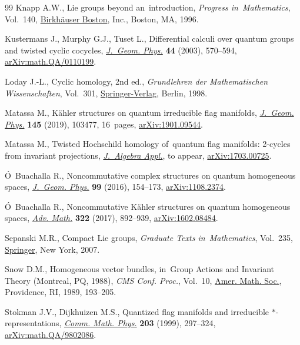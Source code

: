 \documentclass[pdftex]{sigma}
\numberwithin{equation}{section}
\begin{document}
\begin{thebibliography}{99}
Knapp A.W., Lie groups beyond an~introduction, \textit{Progress in~Mathematics}, Vol.~140, \href{https://doi.org/10.1007/978-1-4757-2453-0}{Birkh\"auser Boston}, Inc., Boston, MA, 1996.

Kustermans J., Murphy G.J., Tuset L., Differential calculi over quantum groups
 and twisted cyclic cocycles, \href{https://doi.org/10.1016/S0393-0440(02)00115-8}{\textit{J.~Geom. Phys.}} \textbf{44} (2003),
 570--594, \href{https://arxiv.org/abs/math.QA/0110199}{arXiv:math.QA/0110199}.

Loday J.-L., Cyclic homology, 2nd ed., \textit{Grundlehren der Mathematischen
 Wissenschaften}, Vol.~301, \href{https://doi.org/10.1007/978-3-662-11389-9}{Springer-Verlag}, Berlin, 1998.

Matassa M., K\"ahler structures on quantum irreducible flag manifolds,
 \href{https://doi.org/10.1016/j.geomphys.2019.07.008}{\textit{J.~Geom. Phys.}} \textbf{145} (2019), 103477, 16~pages,
 \href{https://arxiv.org/abs/1901.09544}{arXiv:1901.09544}.

Matassa M., Twisted Hoch\-schild homology of~quantum flag manifolds: 2-cycles
 from invariant projections, \href{http://dx.doi.org/10.1142/S0219498804000940}{\textit{J.~Algebra Appl.}}, {t}o appear,
 \href{https://arxiv.org/abs/1703.00725}{arXiv:1703.00725}.

\'O~Buachalla R., Noncommutative complex structures on quantum homogeneous
 spaces, \href{https://doi.org/10.1016/j.geomphys.2015.10.003}{\textit{J.~Geom. Phys.}} \textbf{99} (2016), 154--173,
 \href{https://arxiv.org/abs/1108.2374}{arXiv:1108.2374}.

\'O~Buachalla R., Noncommutative {K}\"ahler structures on quantum homogeneous
 spaces, \href{https://doi.org/10.1016/j.aim.2017.09.031}{\textit{Adv. Math.}} \textbf{322} (2017), 892--939,
 \href{https://arxiv.org/abs/1602.08484}{arXiv:1602.08484}.

Sepanski M.R., Compact {L}ie groups, \textit{Graduate Texts in~Mathematics},
 Vol.~235, \href{https://doi.org/10.1007/978-0-387-49158-5}{Springer}, New York, 2007.

Snow D.M., Homogeneous vector bundles, in~Group Actions and Invariant Theory
 ({M}ontreal, {PQ}, 1988), \textit{CMS Conf. Proc.}, Vol.~10, \href{https://doi.org/10.1007/bf02564684}{Amer. Math.
 Soc.}, Providence, RI, 1989, 193--205.

Stokman J.V., Dijkhuizen M.S., Quantized flag manifolds and irreducible
 {$*$}-representations, \href{https://doi.org/10.1007/s002200050613}{\textit{Comm. Math. Phys.}} \textbf{203} (1999),
 297--324, \href{https://arxiv.org/abs/math.QA/9802086}{arXiv:math.QA/9802086}.


\end{thebibliography}
\end{document}
